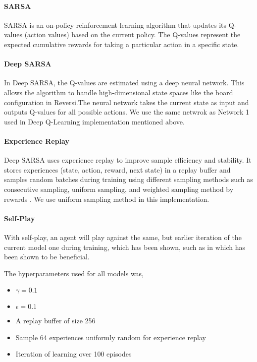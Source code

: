 \documentclass[../report.tex]{subfiles}
\begin{document}
\paragraph{SARSA}
SARSA is an on-policy reinforcement learning algorithm that updates its Q-values (action values) based on the current policy. The Q-values represent the expected cumulative rewards for taking a particular action in a specific state.

\paragraph{Deep SARSA}
In Deep SARSA, the Q-values are estimated using a deep neural network. This allows the algorithm to handle high-dimensional state spaces like the board configuration in Reversi.The neural network takes the current state as input and outputs Q-values for all possible actions. We use the same netwrok as Network 1 used in Deep Q-Learning implementation mentioned above.

\paragraph{Experience Replay}
Deep SARSA uses experience replay to improve sample efficiency and stability. It stores experiences (state, action, reward, next state) in a replay buffer and samples random batches during training using different sampling methods such as consecutive sampling, uniform sampling, and weighted sampling method by rewards \cite{7849837}. We use uniform sampling method in this implementation.

\paragraph{Self-Play}
With self-play, an agent will play against the same, but earlier iteration of the current model one during training, which has been shown, such as in \citet{ree13} which has been shown to be beneficial.

The hyperparameters used for all models was,
\begin{itemize}
    \item $\gamma=0.1$
    \item $\epsilon=0.1$
    \item A replay buffer of size 256
    \item Sample 64 experiences uniformly random for experience replay
    \item Iteration of learning over 100 episodes
\end{itemize}
\end{document}
